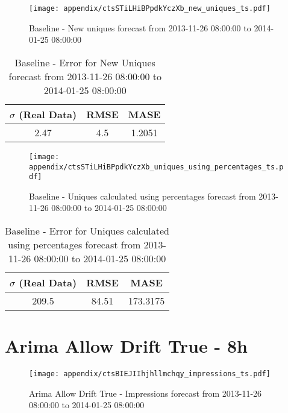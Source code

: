 \begin{figure}[H] \begin{center} \leavevmode
\texttt{[image: appendix/ctsSTiLHiBPpdkYczXb\_new\_uniques\_ts.pdf]} \caption{
Baseline - New uniques forecast from 2013-11-26 08:00:00 to 2014-01-25 08:00:00} \label{fig:appendix/ctsSTiLHiBPpdkYczXb_new_uniques_ts.pdf} \end{center}
\end{figure}

\begin{table}[H]
\centering
\footnotesize
\begin{tabular}{ccc}
$\sigma$ (Real Data) & RMSE & MASE   \\ \hline
2.47 & 4.5 & 1.2051 \\
\end{tabular}

\vspace{0.5cm}

\caption{
Baseline - Error for New Uniques forecast from 2013-11-26 08:00:00 to 2014-01-25 08:00:00}
\end{table}

\begin{figure}[H] \begin{center} \leavevmode
\texttt{[image: appendix/ctsSTiLHiBPpdkYczXb\_uniques\_using\_percentages\_ts.pdf]} \caption{
Baseline - Uniques calculated using percentages forecast from 2013-11-26 08:00:00 to 2014-01-25 08:00:00} \label{fig:appendix/ctsSTiLHiBPpdkYczXb_uniques_using_percentages_ts.pdf} \end{center}
\end{figure}

\begin{table}[H]
\centering
\footnotesize
\begin{tabular}{ccc}
$\sigma$ (Real Data) & RMSE & MASE   \\ \hline
209.5 & 84.51 & 173.3175 \\
\end{tabular}

\vspace{0.5cm}

\caption{
Baseline - Error for Uniques calculated using percentages forecast from 2013-11-26 08:00:00 to 2014-01-25 08:00:00}
\end{table}

\section{Arima Allow Drift True - 8h}
\begin{figure}[H] \begin{center} \leavevmode
\texttt{[image: appendix/ctsBIEJIIhjhllmchqy\_impressions\_ts.pdf]} \caption{
Arima Allow Drift True - Impressions forecast from 2013-11-26 08:00:00 to 2014-01-25 08:00:00} \label{fig:appendix/ctsBIEJIIhjhllmchqy_impressions_ts.pdf} \end{center}
\end{figure}

